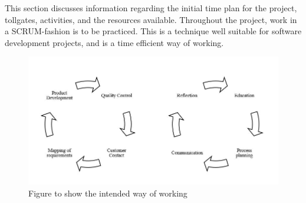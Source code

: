 This section discusses information regarding the initial time plan for the project, tollgates, activities, and the resources available. Throughout the project, work in a SCRUM-fashion is to be practiced. This is a technique well suitable for software development projects, and is a time efficient way of working. 

\begin{figure}[H]
\centering
\includegraphics[width=\linewidth]{Pictures/processes.JPG}
\caption{Figure to show the intended way of working}
\label{fig:processes}
\end{figure}



